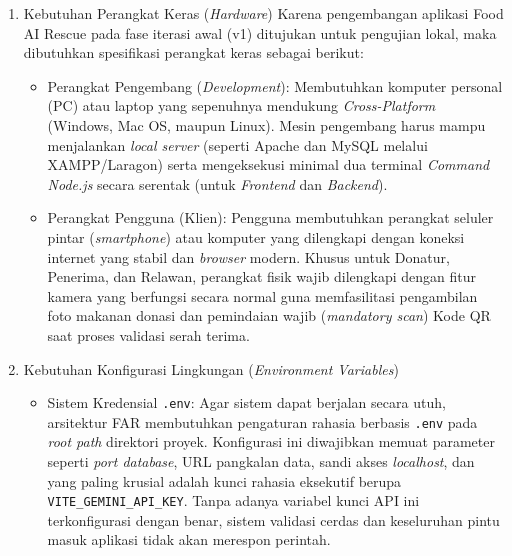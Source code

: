 \begin{enumerate}
    \item Kebutuhan Perangkat Keras (\textit{Hardware})
    Karena pengembangan aplikasi Food AI Rescue pada fase iterasi awal (v1) ditujukan untuk pengujian lokal, maka dibutuhkan spesifikasi perangkat keras sebagai berikut:
    \begin{itemize}
        \item Perangkat Pengembang (\textit{Development}): Membutuhkan komputer personal (PC) atau laptop yang sepenuhnya mendukung \textit{Cross-Platform} (Windows, Mac OS, maupun Linux). Mesin pengembang harus mampu menjalankan \textit{local server} (seperti Apache dan MySQL melalui XAMPP/Laragon) serta mengeksekusi minimal dua terminal \textit{Command Node.js} secara serentak (untuk \textit{Frontend} dan \textit{Backend}).
        \item Perangkat Pengguna (Klien): Pengguna membutuhkan perangkat seluler pintar (\textit{smartphone}) atau komputer yang dilengkapi dengan koneksi internet yang stabil dan \textit{browser} modern. Khusus untuk Donatur, Penerima, dan Relawan, perangkat fisik wajib dilengkapi dengan fitur kamera yang berfungsi secara normal guna memfasilitasi pengambilan foto makanan donasi dan pemindaian wajib (\textit{mandatory scan}) Kode QR saat proses validasi serah terima.
    \end{itemize}

    \item Kebutuhan Konfigurasi Lingkungan (\textit{Environment Variables})
    \begin{itemize}
        \item Sistem Kredensial \texttt{.env}: Agar sistem dapat berjalan secara utuh, arsitektur FAR membutuhkan pengaturan rahasia berbasis \texttt{.env} pada \textit{root path} direktori proyek. Konfigurasi ini diwajibkan memuat parameter seperti \textit{port database}, URL pangkalan data, sandi akses \textit{localhost}, dan yang paling krusial adalah kunci rahasia eksekutif berupa \texttt{VITE\_GEMINI\_API\_KEY}. Tanpa adanya variabel kunci API ini terkonfigurasi dengan benar, sistem validasi cerdas dan keseluruhan pintu masuk aplikasi tidak akan merespon perintah.
    \end{itemize}
\end{enumerate}


